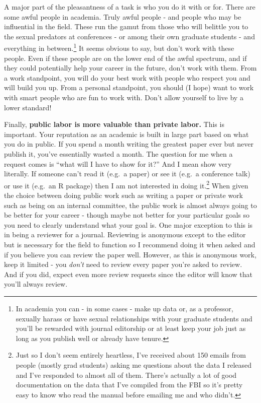 \documentclass[
  12pt,
]{book}
\begin{document}
A major part of the pleasantness of a task is who you do it with or for. There are some awful people in academia. Truly awful people - and people who may be influential in the field. These run the gamut from those who will belittle you to the sexual predators at conferences - or among their own graduate students - and everything in between.\footnote{In academia you can - in some cases - make up data or, as a professor, sexually harass or have sexual relationships with your graduate students and you'll be rewarded with journal editorship or at least keep your job just as long as you publish well or already have tenure.} It seems obvious to say, but don't work with these people. Even if these people are on the lower end of the awful spectrum, and if they could potentially help your career in the future, don't work with them. From a work standpoint, you will do your best work with people who respect you and will build you up. From a personal standpoint, you should (I hope) want to work with smart people who are fun to work with. Don't allow yourself to live by a lower standard!

Finally, \textbf{public labor is more valuable than private labor.} This is important. Your reputation as an academic is built in large part based on what you do in public. If you spend a month writing the greatest paper ever but never publish it, you've essentially wasted a month. The question for me when a request comes is ``what will I have to show for it?'' And I mean show very literally. If someone can't read it (e.g.~a paper) or see it (e.g.~a conference talk) or use it (e.g.~an R package) then I am not interested in doing it.\footnote{Just so I don't seem entirely heartless, I've received about 150 emails from people (mostly grad students) asking me questions about the data I released and I've responded to almost all of them. There's actually a lot of good documentation on the data that I've compiled from the FBI so it's pretty easy to know who read the manual before emailing me and who didn't.} When given the choice between doing public work such as writing a paper or private work such as being on an internal committee, the public work is almost always going to be better for your career - though maybe not better for your particular goals so you need to clearly understand what your goal is. One major exception to this is in being a reviewer for a journal. Reviewing is anonymous except to the editor but is necessary for the field to function so I recommend doing it when asked and if you believe you can review the paper well. However, as this is anonymous work, keep it limited - you \emph{don't} need to review every paper you're asked to review. And if you did, expect even more review requests since the editor will know that you'll always review.
\end{document}
